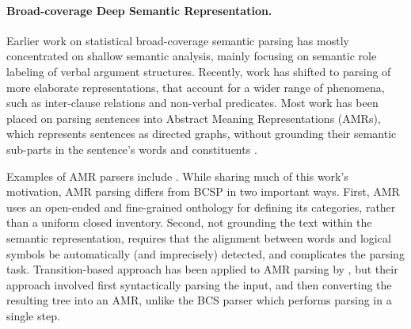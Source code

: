 \documentclass[11pt]{article}
\begin{document}
\paragraph{Broad-coverage Deep Semantic Representation.}
Earlier work on statistical broad-coverage semantic parsing has mostly
concentrated on shallow semantic analysis, mainly focusing on semantic
role labeling of verbal argument structures. 
Recently, work has shifted to parsing of more elaborate representations, that account
for a wider range of phenomena, such as inter-clause relations and non-verbal predicates.
Most work has been placed on parsing sentences into Abstract Meaning Representations (AMRs),
which represents sentences as directed graphs, without
grounding their semantic sub-parts in the sentence's words and constituents
\cite{banarescu2013abstract}.

Examples of AMR parsers include
\cite{flanigan2014discriminative,wang2015transition,vanderwende2015amr,pust2015parsing,artzi2015broad}. 
While sharing much of this work's motivation, AMR parsing differs from BCSP in
two important ways.
First, AMR uses an open-ended and fine-grained onthology for defining its categories,
rather than a uniform closed inventory.
Second, not grounding the text within the semantic representation, 
requires that the alignment between words and logical symbols be automatically
(and imprecisely) detected, and complicates the parsing task.
Transition-based approach has been applied to AMR parsing by ,
but their approach involved first syntactically parsing the input, and then converting
the resulting tree into an AMR, unlike the BCS parser which performs parsing in a single step.
\end{document}
